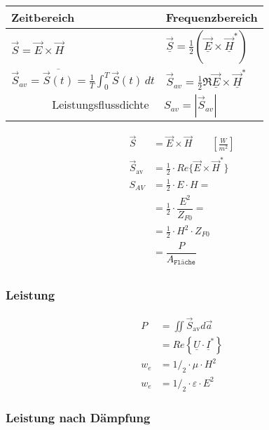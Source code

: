 \begin{tabular}{|l|l|}
\hline
Zeitbereich & Frequenzbereich\\
\hline
$\vec{S} = \vec{E} \times \vec{H}$ & $\vec{\underline{S}} = \frac{1}{2} (\underline{\vec{E}} \times \underline{\vec{H}}^*)$ \\
$\vec{S}_{av} = \overline{\vec{S}(t)} = \frac{1}{T} \int_{0}^{T} \vec{S}(t) \,dt $ & $\vec{S}_{av} = \frac{1}{2} \Re{\underline{\vec{E}} \times \underline{\vec{H}}^*}$\\
\hline
\multicolumn{2}{|c|}{Leistungsflussdichte $\quad S_{av} = |\vec{S}_{av}|$}\\
\hline
\end{tabular}

\begin{align*}
    \vec{S}             & =  \vec{E}\times\vec{H} \qquad \si{\left[\frac{W}{m^2}\right]} \\
    \vec{S}_{\text{av}} & =  \frac{1}{2} \cdot Re\{\vec{E}\times\vec{H}^*\}              \\
    S_{AV}              & =  \frac{1}{2} \cdot E \cdot H =                               \\
                        & =  \frac{1}{2} \cdot \dfrac{E^2}{Z_{F0}} =                     \\
                        & =  \frac{1}{2} \cdot H^2 \cdot Z_{F0}                          \\
                        & =  \dfrac{P}{A_\texttt{Fläche}}                                \\
\end{align*}

\subsubsection{Leistung}

\begin{align*}
    P     & = \iint\vec{S}_{\text{av}}d\vec{a}                   \\
          & = Re\left\{\underline{U}\cdot\underline{I}^*\right\} \\
    w_{e} & = 1/_2\cdot\mu\cdot H^2                              \\
    w_{e} & = 1/_2\cdot\varepsilon\cdot E^2
\end{align*}

\subsubsection{Leistung nach Dämpfung}

